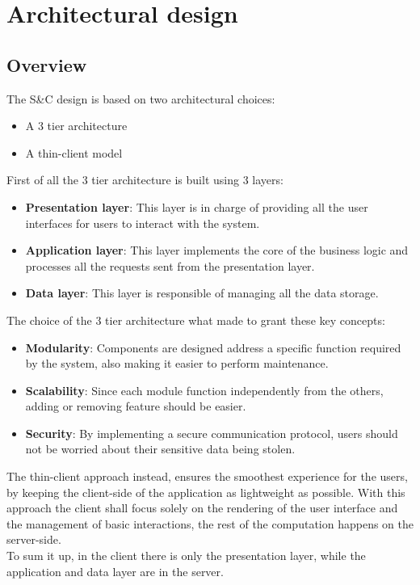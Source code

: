 \documentclass[11pt,twoside]{article}
\begin{document}
\newpage

\section{Architectural design}
	\subsection{Overview}	
The S\&C design is based on two architectural choices:
\begin{itemize}
\item A 3 tier architecture
\item A thin-client model
\end{itemize}
First of all the 3 tier architecture is built using 3 layers:
\begin{itemize}
\item \textbf{Presentation layer}: This layer is in charge of providing all the user interfaces for users to interact with the system.
\item \textbf{Application layer}: This layer implements the core of the business logic and processes all the requests sent from the presentation layer.
\item \textbf{Data layer}: This layer is responsible of managing all the data storage.
\end{itemize}
The choice of the 3 tier architecture what made to grant these key concepts:
\begin{itemize}
\item \textbf{Modularity}: Components are designed address a specific function required by the system, also making it easier to perform maintenance.
\item \textbf{Scalability}: Since each module function independently from the others, adding or removing feature should be easier.
\item \textbf{Security}: By implementing a secure communication protocol, users should not be worried about their sensitive data being stolen.
\end{itemize}
The thin-client approach instead, ensures the smoothest experience for the users, by keeping the client-side of the application as lightweight as possible. With this approach the client shall focus solely on the rendering of the user interface and the management of basic interactions, the rest of the computation happens on the server-side.\\
To sum it up, in the client there is only the presentation layer, while the application and data layer are in the server.
\end{document}
